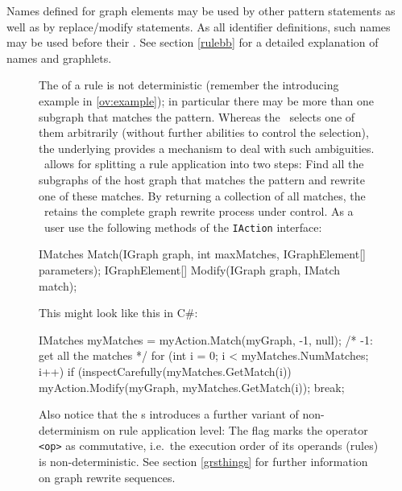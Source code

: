 Names defined for graph elements may be used by other pattern statements as well as by replace/modify statements. 
As all identifier definitions, such names may be used before their . 
See section \ref{rulebb} for a detailed explanation of names and graphlets.
\begin{figure}[htbp]
\begin{note}
\label{note:indeterminism}
The  of a rule is not deterministic (remember the introducing example in \ref{ov:example}); in particular there may be more than one subgraph that matches the pattern. 
Whereas the \GrShell\ selects one of them arbitrarily (without further abilities to control the selection), the underlying \LibGr{} provides a mechanism to deal with such ambiguities. 
\LibGr\ allows for splitting a rule application into two steps: Find all the subgraphs of the host graph that matches the pattern and rewrite one of these matches. 
By returning a collection of all matches, the \LibGr\ retains the complete graph rewrite process under control.
As a \LibGr\ user use the following methods of the \texttt{IAction} interface:
\begin{csharplet}
IMatches Match(IGraph graph, int maxMatches, IGraphElement[] parameters);
IGraphElement[] Modify(IGraph graph, IMatch match);
\end{csharplet}
This might look like this in C\#:
\begin{csharplet}
IMatches myMatches = myAction.Match(myGraph, -1, null); /* -1: get all the matches */
for (int i = 0;  i < myMatches.NumMatches; i++)
{
	if (inspectCarefully(myMatches.GetMatch(i))
	{
		myAction.Modify(myGraph, myMatches.GetMatch(i));
		break;
  	}
}
\end{csharplet}

Also notice that the s introduces a further variant of non-determinism on rule application level: 
The  flag marks the operator \texttt{<op>} as commutative, i.e.\ the execution order of its operands (rules) is non-deterministic. 
See section \ref{grsthings} for further information on graph rewrite sequences.
\end{note}
\end{figure}

